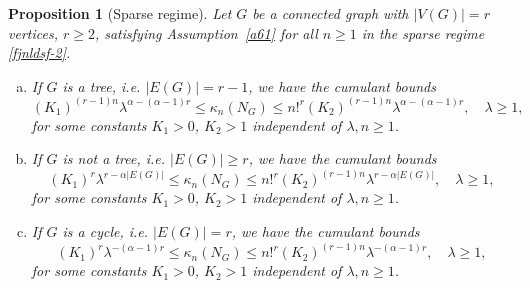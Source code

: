 \documentclass[12pt]{article}
\newtheorem{prop}{Proposition}[section]
\numberwithin{equation}{section}
\begin{document}
\begin{prop}[Sparse regime] 
\label{th6.4}
  Let $G$ be a connected graph with $|V(G)|=r$ vertices, $r\geq 2$,
  satisfying Assumption~\ref{a61} for all $n\geq 1$
  in the sparse regime \eqref{fjnldsf-2}. 
  \begin{enumerate}[a)] 
  \item 
 If $G$ is a tree, i.e. $|E(G)| = r-1$, we have the cumulant bounds %
\begin{equation} 
\label{cumulant-rhop2-0}
  (K_1)^{(r-1)n}
 \lambda^{\alpha  -(\alpha - 1)r }
     \leq 
  \kappa_n(N_G)
  \leq 
  n!^r
  (K_2)^{(r-1)n} \lambda^{ \alpha     -(\alpha - 1)r       } ,
  \quad \lambda \geq 1, 
\end{equation} 
 for some constants $K_1>0$, $K_2>1$ independent of $\lambda, n\geq 1$.
\item
 If $G$ is not a tree, i.e. $|E(G)|\geq r$,
 we have the cumulant bounds %
 \begin{equation} 
 \label{cumulant-rhoph1}
  (K_1)^r 
 \lambda^{r-\alpha |E(G)|}
 \leq 
  \kappa_n(N_G)
  \leq
   n!^r
   (K_2)^{(r-1)n}
   \lambda^{r-\alpha |E(G)|}, 
   \quad \lambda \geq 1,
 \end{equation} 
 for some constants $K_1>0$, $K_2>1$ independent of $\lambda, n\geq 1$. 
\item
  If $G$ is a cycle, i.e. $|E(G)| = r$,
  we have the cumulant bounds %
 \begin{equation} 
\label{cumulant-rhoph2}
  (K_1)^r 
 \lambda^{- (\alpha - 1 )r}
\leq 
  \kappa_n(N_G)
  \leq
  n!^r
  (K_2)^{(r-1)n}
  \lambda^{ - (\alpha -1)r},
    \quad \lambda \geq 1, 
\end{equation} 
 for some constants $K_1>0$, $K_2>1$ independent of $\lambda, n\geq 1$. 
\end{enumerate}
\end{prop}
\end{document}
